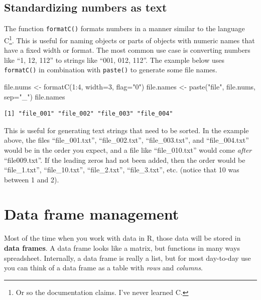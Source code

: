 \documentclass[
  13,
  letterpaper,
]{report}
\newenvironment{Shaded}{\begin{snugshade}}{\end{snugshade}}
\newcommand{\AttributeTok}[1]{\textcolor[rgb]{0.40,0.45,0.13}{#1}}
\newcommand{\DecValTok}[1]{\textcolor[rgb]{0.68,0.00,0.00}{#1}}
\newcommand{\FunctionTok}[1]{\textcolor[rgb]{0.28,0.35,0.67}{#1}}
\newcommand{\NormalTok}[1]{\textcolor[rgb]{0.00,0.23,0.31}{#1}}
\newcommand{\OtherTok}[1]{\textcolor[rgb]{0.00,0.23,0.31}{#1}}
\newcommand{\SpecialCharTok}[1]{\textcolor[rgb]{0.37,0.37,0.37}{#1}}
\newcommand{\StringTok}[1]{\textcolor[rgb]{0.13,0.47,0.30}{#1}}
\begin{document}
\subsection{Standardizing numbers as text}\label{sec-05-char-stan}

The function \texttt{formatC()} formats numbers in a manner similar to
the language C\footnote{Or so the documentation claims. I've never
  learned C.}. This is useful for naming objects or parts of objects
with numeric names that have a fixed width or format. The most common
use case is converting numbers like ``1, 12, 112'' to strings like
``001, 012, 112''. The example below uses \texttt{formatC()} in
combination with \texttt{paste()} to generate some file names.

\begin{Shaded}
\begin{Highlighting}[]
\NormalTok{file.nums }\OtherTok{\textless{}{-}} \FunctionTok{formatC}\NormalTok{(}\DecValTok{1}\SpecialCharTok{:}\DecValTok{4}\NormalTok{, }\AttributeTok{width=}\DecValTok{3}\NormalTok{, }\AttributeTok{flag=}\StringTok{"0"}\NormalTok{)}
\NormalTok{file.names }\OtherTok{\textless{}{-}} \FunctionTok{paste}\NormalTok{(}\StringTok{"file"}\NormalTok{, file.nums, }\AttributeTok{sep=}\StringTok{"\_"}\NormalTok{)}
\NormalTok{file.names}
\end{Highlighting}
\end{Shaded}

\begin{verbatim}
[1] "file_001" "file_002" "file_003" "file_004"
\end{verbatim}

This is useful for generating text strings that need to be sorted. In
the example above, the files ``file\_001.txt'', ``file\_002.txt'',
``file\_003.txt'', and ``file\_004.txt'' would be in the order you
expect, and a file like ``file\_010.txt'' would come \emph{after}
``file009.txt''. If the leading zeros had not been added, then the order
would be ``file\_1.txt'', ``file\_10.txt'', ``file\_2.txt'',
``file\_3.txt'', etc. (notice that 10 was between 1 and 2).

\section{Data frame management}\label{sec-05-df}

Most of the time when you work with data in R, those data will be stored
in \textbf{data frames}. A data frame looks like a matrix, but functions
in many ways spreadsheet. Internally, a data frame is really a list, but
for most day-to-day use you can think of a data frame as a table with
\emph{rows} and \emph{columns}.
\end{document}
